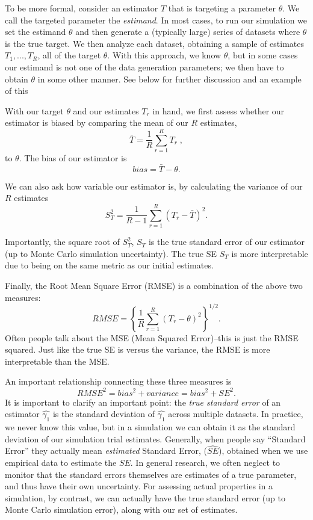 \documentclass[
]{book}
\begin{document}
To be more formal, consider an estimator \(T\) that is targeting a parameter \(\theta\).
We call the targeted parameter the \emph{estimand}.
In most cases, to run our simulation we set the estimand \(\theta\) and then generate a (typically large) series of datasets where \(\theta\) is the true target.
We then analyze each dataset, obtaining a sample of estimates \(T_1,...,T_R\), all of the target \(\theta\).
With this approach, we know \(\theta\), but in some cases our estimand is not one of the data generation parameters; we then have to obtain \(\theta\) in some other manner.
See below for further discussion and an example of this

With our target \(\theta\) and our estimates \(T_r\) in hand, we first assess whether our estimator is biased by comparing the mean of our \(R\) estimates,
\[ \bar{T} = \frac{1}{R}\sum_{r=1}^R T_r \;,\]
to \(\theta\).
The bias of our estimator is
\[bias = \bar{T} - \theta .\]

We can also ask how variable our estimator is, by calculating the variance of our \(R\) estimates
\[\displaystyle{S_T^2 = \frac{1}{R - 1}\sum_{r=1}^R \left(T_r - \bar{T}\right)^2} . \]

Importantly, the square root of \(S^2_T\), \(S_T\) is the true standard error of our estimator (up to Monte Carlo simulation uncertainty).
The true SE \(S_T\) is more interpretable due to being on the same metric as our initial estimates.

Finally, the Root Mean Square Error (RMSE) is a combination of the above two measures:
\[ RMSE = \left\{ \frac{1}{R} \sum_{r = 1}^R \left( T_r - \theta\right)^2 \right\}^{1/2}. \]
Often people talk about the MSE (Mean Squared Error)--this is just the RMSE squared.
Just like the true SE is versus the variance, the RMSE is more interpretable than the MSE.

An important relationship connecting these three measures is
\[ RMSE^2 = bias^2 + variance = bias^2 + SE^2 .\]
It is important to clarify an important point: the \emph{true standard error} of an estimator \(\hat{\gamma_1}\) is the standard deviation of \(\hat{\gamma_1}\) across multiple datasets.
In practice, we never know this value, but in a simulation we can obtain it as the standard deviation of our simulation trial estimates.
Generally, when people say ``Standard Error'' they actually mean \emph{estimated} Standard Error, (\(\widehat{SE}\)), obtained when we use empirical data to estimate the \(SE\).
In general research, we often neglect to monitor that the standard errors themselves are estimates of a true parameter, and thus have their own uncertainty.
For assessing actual properties in a simulation, by contrast, we can actually have the true standard error (up to Monte Carlo simulation error), along with our set of estimates.
\end{document}
